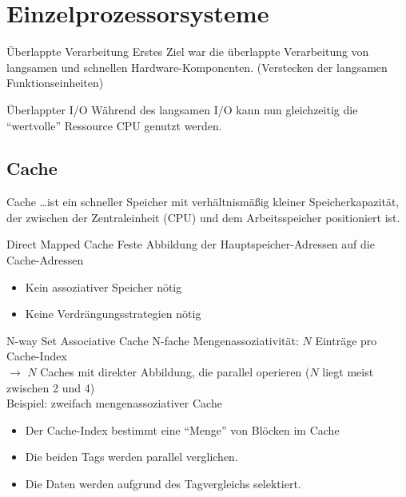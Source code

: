 \section{Einzelprozessorsysteme}\label{sec:einzelprozessorsysteme}

\begin{defi}{Überlappte Verarbeitung}
    Erstes Ziel war die überlappte Verarbeitung von langsamen und schnellen Hardware-Komponenten. 
    (Verstecken der langsamen Funktionseinheiten)
\end{defi}

\begin{defi}{Überlappter I/O}
    Während des langsamen I/O kann nun gleichzeitig die \enquote{wertvolle} Ressource CPU genutzt werden.
\end{defi}

\subsection{Cache}\label{subsec:cache}

\begin{defi}{Cache}
    \ldots ist ein schneller Speicher mit verhältnismäßig kleiner Speicherkapazität, 
    der zwischen der Zentraleinheit (CPU) und dem Arbeitsspeicher positioniert ist.
\end{defi}

\begin{defi}{Direct Mapped Cache}
    Feste Abbildung der Hauptspeicher-Adressen auf die Cache-Adressen
    \begin{itemize}[$\to$]
        \item Kein assoziativer Speicher nötig
        \item Keine Verdrängungsstrategien nötig
    \end{itemize}
\end{defi}

\begin{defi}{N-way Set Associative Cache}
    N-fache Mengenassoziativität: $N$ Einträge pro Cache-Index\\
    $\to$ $N$ Caches mit direkter Abbildung, die parallel operieren
    ($N$ liegt meist zwischen 2 und 4)\\
    Beispiel: zweifach mengenassoziativer Cache
    \begin{itemize}
        \item Der Cache-Index bestimmt eine \enquote{Menge} von Blöcken im Cache
        \item Die beiden Tags werden parallel verglichen.
        \item Die Daten werden aufgrund des Tagvergleichs selektiert.
    \end{itemize}
\end{defi}

